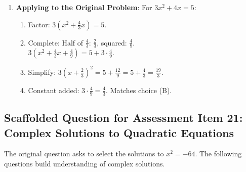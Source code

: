 \documentclass[12pt]{article}
\begin{document}
\begin{enumerate}[label=20.\arabic*]
\begin{enumerate}[label=\alph*)]
    \end{enumerate}
    \item \textbf{Applying to the Original Problem}: For \( 3x^2 + 4x = 5 \):
    \begin{enumerate}[label=\alph*)]
        \item Factor: \( 3(x^2 + \frac{4}{3}x) = 5 \).
        \item Complete: Half of \( \frac{4}{3} \): \( \frac{2}{3} \), squared: \( \frac{4}{9} \). \\
        \( 3\left(x^2 + \frac{4}{3}x + \frac{4}{9}\right) = 5 + 3 \cdot \frac{4}{9} \).
        \item Simplify: \( 3\left(x + \frac{2}{3}\right)^2 = 5 + \frac{12}{9} = 5 + \frac{4}{3} = \frac{19}{3} \).
        \item Constant added: \( 3 \cdot \frac{4}{9} = \frac{4}{3} \). Matches choice (B).
    \end{enumerate}
\end{enumerate}

\subsection*{Scaffolded Question for Assessment Item 21: Complex Solutions to Quadratic Equations}
The original question asks to select the solutions to \( x^2 = -64 \). The following questions build understanding of complex solutions.
\end{document}
